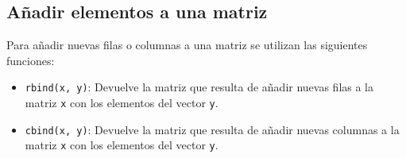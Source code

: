 \documentclass[
  a4paper,
]{scrreport}
\providecommand{\tightlist}{%
  \setlength{\itemsep}{0pt}\setlength{\parskip}{0pt}}\usepackage{longtable,booktabs,array}
\theoremstyle{definition}
\theoremstyle{definition}
\theoremstyle{remark}
\begin{document}
\hypertarget{auxf1adir-elementos-a-una-matriz}{%
\subsection{Añadir elementos a una
matriz}\label{auxf1adir-elementos-a-una-matriz}}

Para añadir nuevas filas o columnas a una matriz se utilizan las
siguientes funciones:

\begin{itemize}
\tightlist
\item
  \texttt{rbind(x,\ y)}: Devuelve la matriz que resulta de añadir nuevas
  filas a la matriz \texttt{x} con los elementos del vector \texttt{y}.
\item
  \texttt{cbind(x,\ y)}: Devuelve la matriz que resulta de añadir nuevas
  columnas a la matriz \texttt{x} con los elementos del vector
  \texttt{y}.
\end{itemize}
\end{document}
